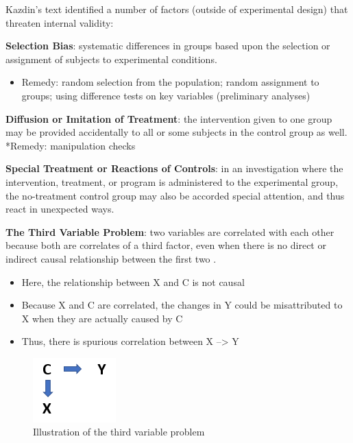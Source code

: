 \documentclass[
  english,
]{book}
\providecommand{\tightlist}{%
  \setlength{\itemsep}{0pt}\setlength{\parskip}{0pt}}
\begin{document}
Kazdin's \citeyearpar{kazdin_research_2017} text identified a number of factors (outside of experimental design) that threaten internal validity:

\textbf{Selection Bias}: systematic differences in groups based upon the selection or assignment of subjects to experimental conditions.

\begin{itemize}
\tightlist
\item
  Remedy: random selection from the population; random assignment to groups; using difference tests on key variables (preliminary analyses)
\end{itemize}

\textbf{Diffusion or Imitation of Treatment}: the intervention given to one group may be provided accidentally to all or some subjects in the control group as well.
*Remedy: manipulation checks

\textbf{Special Treatment or Reactions of Controls}: in an investigation where the intervention, treatment, or program is administered to the experimental group, the no-treatment control group may also be accorded special attention, and thus react in unexpected ways.

\textbf{The Third Variable Problem}: two variables are correlated with each other because both are correlates of a third factor, even when there is no direct or indirect causal relationship between the first two \citep{reis_research_2000}.

\begin{itemize}
\tightlist
\item
  Here, the relationship between X and C is not causal
\item
  Because X and C are correlated, the changes in Y could be misattributed to X when they are actually caused by C
\item
  Thus, there is spurious correlation between X --\textgreater{} Y
\end{itemize}

\begin{figure}
\centering
\includegraphics{images/Experiment/ThirdVariable.png}
\caption{Illustration of the third variable problem}
\end{figure}
\end{document}
